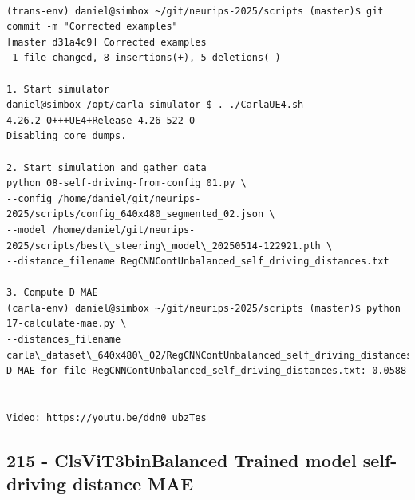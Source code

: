 \begin{verbatim}

(trans-env) daniel@simbox ~/git/neurips-2025/scripts (master)$ git commit -m "Corrected examples"
[master d31a4c9] Corrected examples
 1 file changed, 8 insertions(+), 5 deletions(-)

1. Start simulator
daniel@simbox /opt/carla-simulator $ . ./CarlaUE4.sh 
4.26.2-0+++UE4+Release-4.26 522 0
Disabling core dumps.

2. Start simulation and gather data
python 08-self-driving-from-config_01.py \
--config /home/daniel/git/neurips-2025/scripts/config_640x480_segmented_02.json \
--model /home/daniel/git/neurips-2025/scripts/best\_steering\_model\_20250514-122921.pth \
--distance_filename RegCNNContUnbalanced_self_driving_distances.txt

3. Compute D MAE
(carla-env) daniel@simbox ~/git/neurips-2025/scripts (master)$ python 17-calculate-mae.py \
--distances_filename carla\_dataset\_640x480\_02/RegCNNContUnbalanced_self_driving_distances.txt
D MAE for file RegCNNContUnbalanced_self_driving_distances.txt: 0.0588


Video: https://youtu.be/ddn0_ubzTes

\end{verbatim}

\subsection{215 - ClsViT3binBalanced Trained model self-driving distance MAE}
\label{app_res:215}

